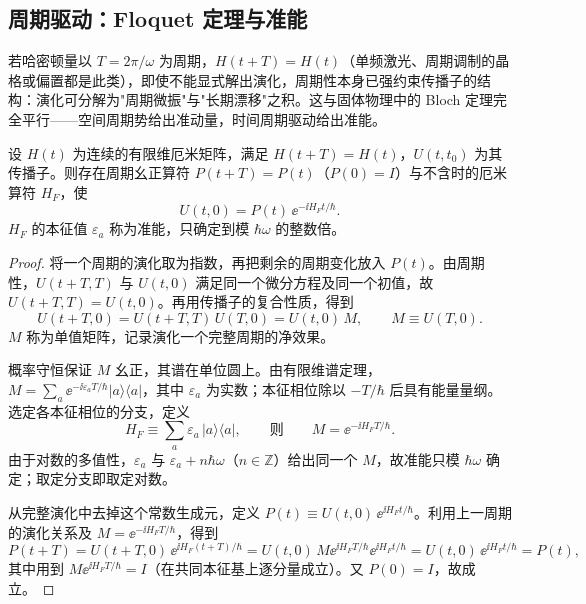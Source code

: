 \subsection{周期驱动：Floquet 定理与准能}
\label{sec:floquet}

若哈密顿量以 $T=2\pi/\omega$ 为周期，$H(t+T)=H(t)$（单频激光、周期调制的晶格或偏置都是此类），即使不能显式解出演化，周期性本身已强约束传播子的结构：演化可分解为"周期微振"与"长期漂移"之积。这与固体物理中的 Bloch 定理完全平行——空间周期势给出准动量，时间周期驱动给出准能。

\begin{theorem}
设 $H(t)$ 为连续的有限维厄米矩阵，满足 $H(t+T)=H(t)$，$U(t,t_0)$ 为其传播子。则存在周期幺正算符 $P(t+T)=P(t)$（$P(0)=I$）与不含时的厄米算符 $H_F$，使
\begin{equation}
U(t,0)=P(t)\,\ee^{-\ii H_F t/\hbar}.
\label{eq:tdpt-floquet}
\end{equation}
$H_F$ 的本征值 $\varepsilon_a$ 称为准能，只确定到模 $\hbar\omega$ 的整数倍。
\end{theorem}

\begin{proof}
将一个周期的演化取为指数，再把剩余的周期变化放入 $P(t)$。由周期性，$U(t+T,T)$ 与 $U(t,0)$ 满足同一个微分方程及同一个初值，故 $U(t+T,T)=U(t,0)$。再用传播子的复合性质，得到
\[
U(t+T,0)=U(t+T,T)\,U(T,0)=U(t,0)\,M,
\qquad
M\equiv U(T,0).
\]
$M$ 称为单值矩阵，记录演化一个完整周期的净效果。

概率守恒保证 $M$ 幺正，其谱在单位圆上。由有限维谱定理，$M=\sum_a\ee^{-\ii\varepsilon_a T/\hbar}|a\rangle\langle a|$，其中 $\varepsilon_a$ 为实数；本征相位除以 $-T/\hbar$ 后具有能量量纲。选定各本征相位的分支，定义
\[
H_F\equiv\sum_a\varepsilon_a\,|a\rangle\langle a|,
\qquad\text{则}\qquad
M=\ee^{-\ii H_F T/\hbar}.
\]
由于对数的多值性，$\varepsilon_a$ 与 $\varepsilon_a+n\hbar\omega$（$n\in\mathbb Z$）给出同一个 $M$，故准能只模 $\hbar\omega$ 确定；取定分支即取定对数。

从完整演化中去掉这个常数生成元，定义 $P(t)\equiv U(t,0)\,\ee^{\ii H_F t/\hbar}$。利用上一周期的演化关系及 $M=\ee^{-\ii H_FT/\hbar}$，得到
\[
P(t+T)=U(t+T,0)\,\ee^{\ii H_F(t+T)/\hbar}
=U(t,0)\,M\ee^{\ii H_FT/\hbar}\ee^{\ii H_Ft/\hbar}
=U(t,0)\,\ee^{\ii H_Ft/\hbar}=P(t),
\]
其中用到 $M\ee^{\ii H_FT/\hbar}=I$（在共同本征基上逐分量成立）。又 $P(0)=I$，故成立。
\end{proof}

